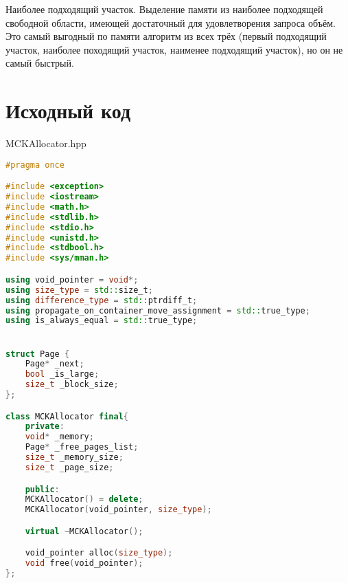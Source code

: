 \documentclass[a4paper, 12pt]{article}
\begin{document}
Наиболее подходящий участок. Выделение памяти из наиболее подходящей свободной области, имеющей достаточный для удовлетворения запроса объём. Это самый выгодный по памяти алгоритм из всех трёх (первый подходящий участок, наиболее походящий участок, наименее подходящий участок), но он не самый быстрый.

\newpage

\section{Исходный код}
MCKAllocator.hpp
\begin{lstlisting}[language=C++]
#pragma once

#include <exception>
#include <iostream>
#include <math.h>
#include <stdlib.h>
#include <stdio.h>
#include <unistd.h>
#include <stdbool.h>
#include <sys/mman.h>

using void_pointer = void*;
using size_type = std::size_t;
using difference_type = std::ptrdiff_t;
using propagate_on_container_move_assignment = std::true_type;
using is_always_equal = std::true_type;


struct Page {
    Page* _next;
    bool _is_large;
    size_t _block_size;
};

class MCKAllocator final{
    private:
    void* _memory;
    Page* _free_pages_list;
    size_t _memory_size;
    size_t _page_size;

    public:
    MCKAllocator() = delete;
    MCKAllocator(void_pointer, size_type);

    virtual ~MCKAllocator();

    void_pointer alloc(size_type);
    void free(void_pointer);
};
\end{lstlisting}
\end{document}
